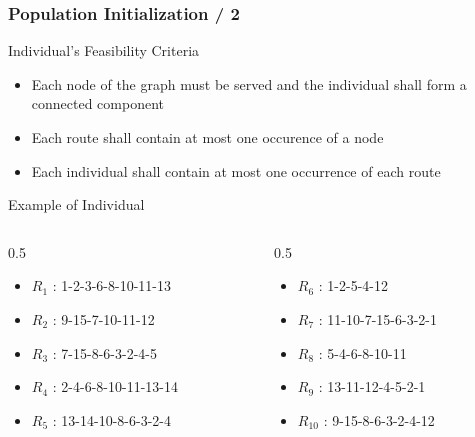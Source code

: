 \documentclass[dvipsnames]{beamer}
\begin{document}
\begin{frame}
  \frametitle{Population Initialization / 2}
  \begin{alertblock}{Individual's Feasibility Criteria}
    \begin{itemize}
      \item Each node of the graph must be served and the individual shall form a connected component
      \item Each route shall contain at most one occurence of a node
      \item Each individual shall contain at most one occurrence of each route
    \end{itemize}
  \end{alertblock}

  \begin{exampleblock}{Example of Individual}
    \label{example:individual}
    \begin{columns}
      \begin{column}{0.5\textwidth}
        \begin{itemize}
          \item  \textbf{$R_{1}$} : 1-2-3-6-8-10-11-13
          \item  \textbf{$R_{2}$} : 9-15-7-10-11-12
          \item  \textbf{$R_{3}$} : 7-15-8-6-3-2-4-5
          \item  \textbf{$R_{4}$} : 2-4-6-8-10-11-13-14
          \item  \textbf{$R_{5}$} : 13-14-10-8-6-3-2-4
        \end{itemize}
      \end{column}
      \begin{column}{0.5\textwidth}
        \begin{itemize}
          \item  \textbf{$R_{6}$} : 1-2-5-4-12
          \item  \textbf{$R_{7}$} : 11-10-7-15-6-3-2-1
          \item  \textbf{$R_{8}$} : 5-4-6-8-10-11
          \item  \textbf{$R_{9}$} : 13-11-12-4-5-2-1
          \item \textbf{$R_{10}$} : 9-15-8-6-3-2-4-12
        \end{itemize}
      \end{column}
    \end{columns}
  \end{exampleblock}
\end{frame}
\end{document}
